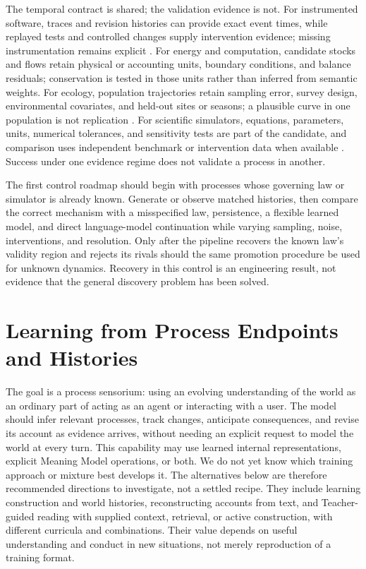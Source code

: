 \documentclass[10pt]{article}
\begin{document}
The temporal contract is shared; the validation evidence is not. For
instrumented software, traces and revision histories can provide exact event
times, while replayed tests and controlled changes supply intervention evidence;
missing instrumentation remains explicit
\cite{otelSignals2026,linuxFtrace2026}. For energy and computation, candidate
stocks and flows retain physical or accounting units, boundary conditions, and
balance residuals; conservation is tested in those units rather than inferred
from semantic weights. For ecology, population trajectories retain sampling
error, survey design, environmental covariates, and held-out sites or seasons;
a plausible curve in one population is not replication
\cite{may1974populations}. For scientific simulators, equations, parameters,
units, numerical tolerances, and sensitivity tests are part of the candidate,
and comparison uses independent benchmark or intervention data when available
\cite{clerx2020cellml,keating2020sbml,modelica2026spec}. Success under one
evidence regime does not validate a process in another.

The first control roadmap should begin with processes whose governing law or
simulator is already known. Generate or observe matched histories, then compare
the correct mechanism with a misspecified law, persistence, a flexible learned
model, and direct language-model continuation while varying sampling, noise,
interventions, and resolution. Only after the pipeline recovers the known law's
validity region and rejects its rivals should the same promotion procedure be
used for unknown dynamics. Recovery in this control is an engineering result,
not evidence that the general discovery problem has been solved.

\section{Learning from Process Endpoints and Histories}
\label{sec:learning}

The goal is a process sensorium: using an evolving understanding of the world
as an ordinary part of acting as an agent or interacting with a user. The model
should infer relevant processes, track changes, anticipate consequences, and
revise its account as evidence arrives, without needing an explicit request
to model the world at every turn. This capability may use learned internal
representations, explicit Meaning Model operations, or both. We do not yet
know which training approach or mixture best develops it. The alternatives
below are therefore recommended directions to investigate, not a settled
recipe. They include learning construction and world histories, reconstructing
accounts from text, and Teacher-guided reading with supplied context,
retrieval, or active construction, with different curricula and combinations.
Their value depends on useful understanding and conduct in new situations,
not merely reproduction of a training format.
\end{document}
